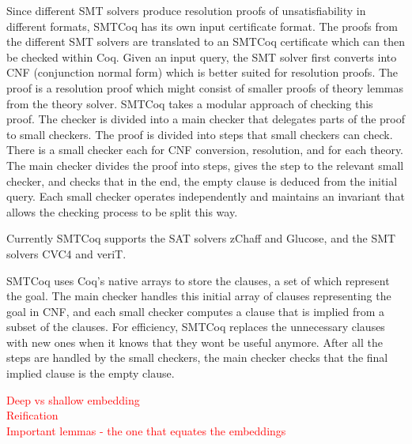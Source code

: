 \documentclass{article}
\begin{document}
	Since different SMT solvers produce resolution 
	proofs of unsatisfiability in different formats, 
	SMTCoq has its own input certificate format. 
	The proofs from the different SMT solvers are 
	translated to an SMTCoq certificate which 
	can then be checked within Coq. Given an input 
	query, the SMT solver first converts into CNF
	(conjunction normal form) which is better 
	suited for resolution proofs. The proof is a 
	resolution proof which might consist of smaller proofs 
	of theory lemmas from the theory solver. 
	SMTCoq takes a modular approach of checking this proof.
	The checker is divided into a main checker that 
	delegates parts of the proof to small checkers. The proof 
	is divided into steps that small checkers can check.
	There is a small checker each for CNF conversion, 
	resolution, and for each theory. The main checker divides the 
	proof into steps, gives the step to the relevant small 
	checker, and checks that in the end, the empty 
	clause is deduced from the initial query. Each small 
	checker operates independently and maintains an invariant
	that allows the checking process to be split this way.
	
	Currently SMTCoq supports the SAT solvers zChaff and Glucose, 
	and the SMT solvers CVC4 and veriT. 
	
	SMTCoq uses Coq's native arrays to store the clauses, 
	a set of which represent the goal. The main checker 
	handles this initial array of clauses representing the 
	goal in CNF, and each small checker computes a 
	clause that is implied from a subset of the clauses.
	For efficiency, SMTCoq replaces the unnecessary 
	clauses with new ones when it knows that they 
	wont be useful anymore. After all the steps 
	are handled by the small checkers, the main 
	checker checks that the final implied clause is 
	the empty clause.
	
	\textcolor{red}{Deep vs shallow embedding}\\
	\textcolor{red}{Reification}\\
	\textcolor{red}{Important lemmas - the one that equates the embeddings}\\
	
\end{document}
